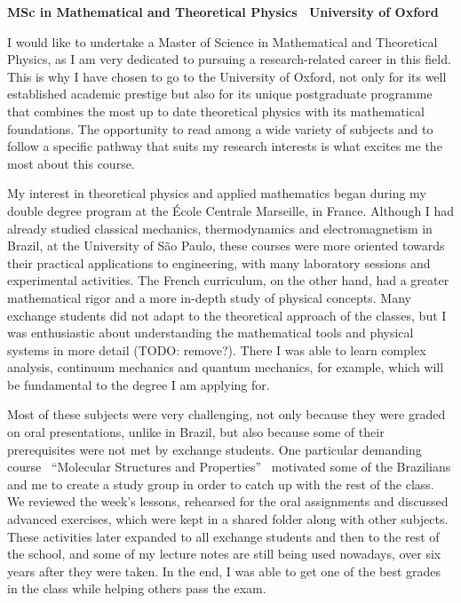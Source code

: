 \documentclass[11pt]{article}
\newcommand*{\NEWLINE}{\vspace{0.75em}}
\begin{document}
\sffamily %

{\bfseries MSc in Mathematical and Theoretical Physics \textemdash~University of Oxford}
\NEWLINE{}\NEWLINE{}


I would like to undertake a Master of Science in Mathematical and Theoretical Physics, as I am very dedicated to pursuing a research-related career in this field. This is why I have chosen to go to the University of Oxford, not only for its well established academic prestige but also for its unique postgraduate programme that combines the most up to date theoretical physics with its mathematical foundations. The opportunity to read among a wide variety of subjects and to follow a specific pathway that suits my research interests is what excites me the most about this course. \NEWLINE{}

My interest in theoretical physics and applied mathematics began during my double degree program at the École Centrale Marseille, in France. Although I had already studied classical mechanics, thermodynamics and electromagnetism in Brazil, at the University of São Paulo, these courses were more oriented towards their practical applications to engineering, with many laboratory sessions and experimental activities. The French curriculum, on the other hand, had a greater mathematical rigor and a more in-depth study of physical concepts. Many exchange students did not adapt to the theoretical approach of the classes, but I was enthusiastic about understanding the mathematical tools and physical systems in more detail (TODO: remove?). There I was able to learn complex analysis, continuum mechanics and quantum mechanics, for example, which will be fundamental to the degree I am applying for. \NEWLINE{}

Most of these subjects were very challenging, not only because they were graded on oral presentations, unlike in Brazil, but also because some of their prerequisites were not met by exchange students. One particular demanding course \textemdash~``Molecular Structures and Properties'' \textemdash~motivated some of the Brazilians and me to create a study group in order to catch up with the rest of the class. We reviewed the week's lessons, rehearsed for the oral assignments and discussed advanced exercises, which were kept in a shared folder along with other subjects. These activities later expanded to all exchange students and then to the rest of the school, and some of my lecture notes are still being used nowadays, over six years after they were taken. In the end, I was able to get one of the best grades in the class while helping others pass the exam. \NEWLINE{}
\end{document}
